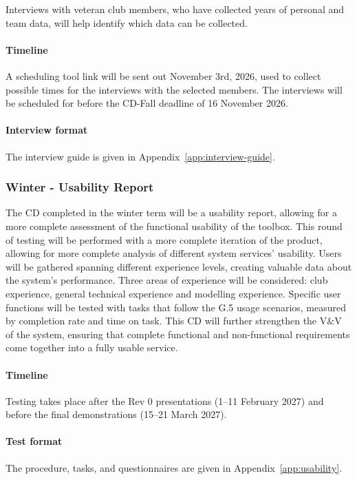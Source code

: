 \documentclass[12pt, titlepage]{article}
\begin{document}
Interviews with veteran club members, who have collected years of personal and team data,
will help identify which data can be collected.

\paragraph{Timeline} A scheduling tool link will be sent out November 3rd, 2026, used to collect possible times for the interviews with the selected members. 
The interviews will be scheduled for before the CD-Fall deadline of 16 November 2026.

\paragraph{Interview format} The interview guide is given in Appendix~\ref{app:interview-guide}.

\subsubsection{Winter - Usability Report}

The CD completed in the winter term will be a usability report, allowing for a more complete assessment of the functional 
usability of the toolbox. 
This round of testing will be performed with a more complete iteration of the product, allowing for
 more complete analysis of different system services' usability. 
Users will be gathered spanning different experience levels, creating valuable data about the system's performance. 
Three areas of experience will be considered: club experience, general technical experience and modelling experience.
Specific user functions will be tested with tasks that follow the G.5 usage scenarios, measured by completion rate and time on task. This CD will 
further strengthen the V\&V of the system, ensuring that complete functional and non-functional requirements come together into a fully usable service.

\paragraph{Timeline} Testing takes place after the Rev 0 presentations (1--11 February 2027) and before the final demonstrations
(15--21 March 2027).

\paragraph{Test format} The procedure, tasks, and questionnaires are given in Appendix~\ref{app:usability}.
\end{document}
